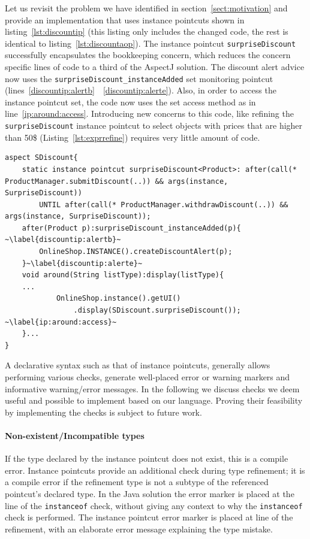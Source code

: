\documentclass[10pt]{sigplanconf}
\newcommand{\lstinln}[1]{\lstinline~#1~}
\begin{document}
Let us revisit the problem we have identified in section~\ref{sect:motivation} and provide an implementation that uses instance pointcuts shown in listing~\ref{lst:discountip} (this listing only includes the changed code, the rest is identical to listing~\ref{lst:discountaop}). The instance pointcut \lstinln{surpriseDiscount} successfully encapsulates the bookkeeping concern, which reduces the concern specific lines of code to a third of the AspectJ solution. The discount alert advice now uses the \lstinln{surpriseDiscount_instanceAdded} set monitoring pointcut (lines~\ref{discountip:alertb}~\textendash~\ref{discountip:alerte}). Also, in order to access the instance pointcut set, the code now uses the set access method as in line~\ref{ip:around:access}. Introducing new concerns to this code, like refining the \lstinln{surpriseDiscount} instance pointcut to select objects with prices that are higher than 50\$ (Listing~\ref{lst:exprrefine}) requires very little amount of code.

\begin{lstlisting}[float=h, moreemph=instance, caption={The instance pointcut implementation of the discount alert concern}, label={lst:discountip}]
aspect SDiscount{
	static instance pointcut surpriseDiscount<Product>: after(call(* ProductManager.submitDiscount(..)) && args(instance, SurpriseDiscount))
		UNTIL after(call(* ProductManager.withdrawDiscount(..)) && args(instance, SurpriseDiscount));
	after(Product p):surpriseDiscount_instanceAdded(p){ ~\label{discountip:alertb}~
		OnlineShop.INSTANCE().createDiscountAlert(p);
	}~\label{discountip:alerte}~
	void around(String listType):display(listType){
	...
			OnlineShop.instance().getUI()
				.display(SDiscount.surpriseDiscount()); ~\label{ip:around:access}~
	}...
}
\end{lstlisting}

A declarative syntax such as that of instance pointcuts, generally allows performing various checks, generate well-placed error or warning markers and informative warning/error messages.
In the following we discuss checks we deem useful and possible to implement based on our language.
Proving their feasibility by implementing the checks is subject to future work.

\paragraph*{Non-existent/Incompatible types} If the type declared by the instance pointcut does not exist, this is a compile error. Instance pointcuts provide an additional check during type refinement; it is a compile error if the refinement type is not a subtype of the referenced pointcut's declared type. In the Java solution the error marker is placed at the line of the \lstinln{instanceof} check, without giving any context to why the \lstinln{instanceof} check is performed. The instance pointcut error marker is placed at line of the refinement, with an elaborate error message explaining the type mistake.
\end{document}
